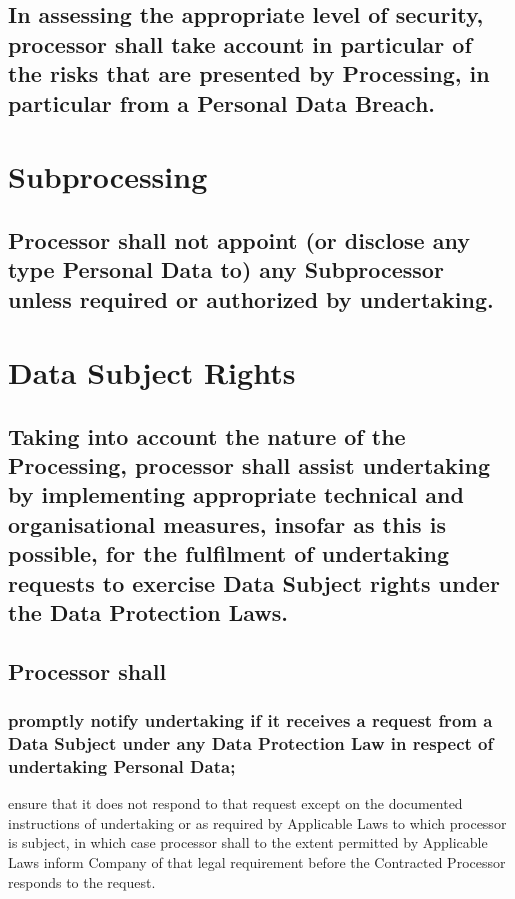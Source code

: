 \documentclass[a4paper]{article}
\begin{document}
\subsection{In assessing the appropriate level of security, \gls{processor} shall take account in particular of the risks that are presented by Processing, in particular from a Personal Data Breach.}

\section{Subprocessing}

\subsection{Processor shall not appoint (or disclose any \gls{type} Personal Data to) any Subprocessor unless required or authorized by \gls{undertaking}.}

\section{Data Subject Rights}

\subsection{Taking into account the nature of the Processing, \gls{processor} shall assist \gls{undertaking} by implementing appropriate technical and organisational measures, insofar as this is possible, for the fulfilment of \gls{undertaking} requests to exercise Data Subject rights under the Data Protection Laws.}

\subsection{Processor shall}

\subsubsection{promptly notify \gls{undertaking} if it receives a request from a Data Subject under any Data Protection Law in respect of \gls{undertaking} Personal Data;}

ensure that it does not respond to that request except on the documented instructions of \gls{undertaking} or as required by Applicable Laws to which \gls{processor} is subject, in which case \gls{processor} shall to the extent permitted by Applicable Laws inform Company of that legal requirement before the Contracted Processor responds to the request.
\end{document}
